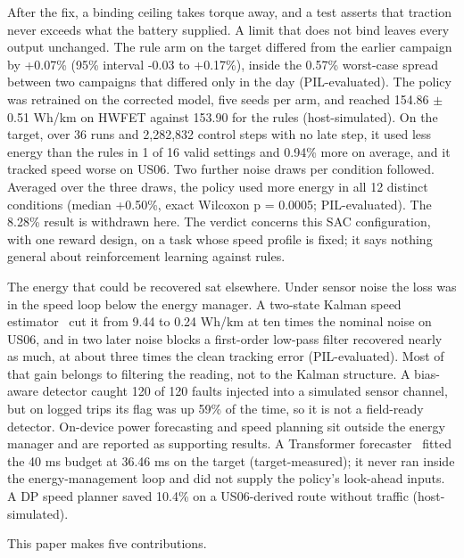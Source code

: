 \documentclass{ieeeaccess}
\begin{document}
After the fix, a binding ceiling takes torque away, and a test asserts that traction never exceeds what the battery supplied. A limit that does not bind leaves every output unchanged. The rule arm on the target differed from the earlier campaign by +0.07\% (95\% interval -0.03 to +0.17\%), inside the 0.57\% worst-case spread between two campaigns that differed only in the day (PIL-evaluated). The policy was retrained on the corrected model, five seeds per arm, and reached 154.86 $\pm$ 0.51 Wh/km on HWFET against 153.90 for the rules (host-simulated). On the target, over 36 runs and 2,282,832 control steps with no late step, it used less energy than the rules in 1 of 16 valid settings and 0.94\% more on average, and it tracked speed worse on US06. Two further noise draws per condition followed. Averaged over the three draws, the policy used more energy in all 12 distinct conditions (median +0.50\%, exact Wilcoxon p = 0.0005; PIL-evaluated). The 8.28\% result is withdrawn here. The verdict concerns this SAC configuration, with one reward design, on a task whose speed profile is fixed; it says nothing general about reinforcement learning against rules.

The energy that could be recovered sat elsewhere. Under sensor noise the loss was in the speed loop below the energy manager. A two-state Kalman speed estimator~\cite{kalman1960} cut it from 9.44 to 0.24 Wh/km at ten times the nominal noise on US06, and in two later noise blocks a first-order low-pass filter recovered nearly as much, at about three times the clean tracking error (PIL-evaluated). Most of that gain belongs to filtering the reading, not to the Kalman structure. A bias-aware detector caught 120 of 120 faults injected into a simulated sensor channel, but on logged trips its flag was up 59\% of the time, so it is not a field-ready detector. On-device power forecasting and speed planning sit outside the energy manager and are reported as supporting results. A Transformer forecaster~\cite{vaswani2017} fitted the 40 ms budget at 36.46 ms on the target (target-measured); it never ran inside the energy-management loop and did not supply the policy's look-ahead inputs. A DP speed planner saved 10.4\% on a US06-derived route without traffic (host-simulated).

This paper makes five contributions.
\end{document}
